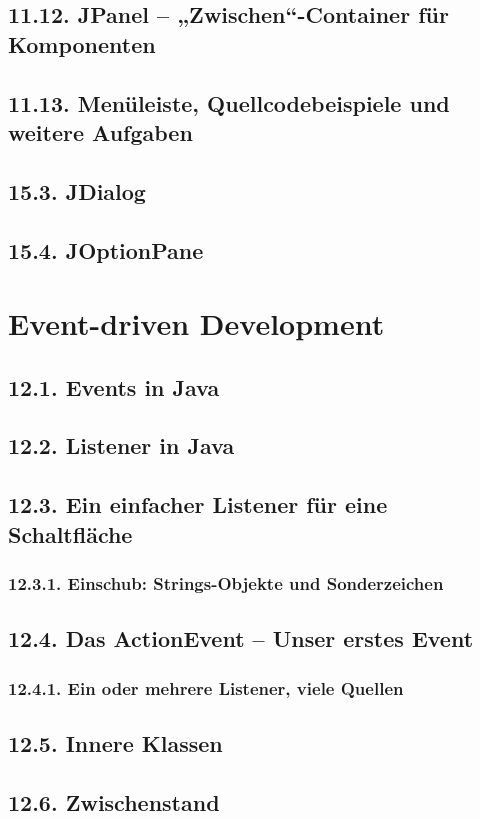 \section{11.12.	JPanel – „Zwischen“-Container für Komponenten}
\section{11.13.	Menüleiste, Quellcodebeispiele und weitere Aufgaben}
\section{15.3.	JDialog}
\section{15.4.	JOptionPane}

\chapter{Event-driven Development}
\section{12.1.	Events in Java}
\section{12.2.	Listener in Java}
\section{12.3.	Ein einfacher Listener für eine Schaltfläche}
\subsection{12.3.1.	Einschub: Strings-Objekte und Sonderzeichen}
\section{12.4.	Das ActionEvent – Unser erstes Event}
\subsection{12.4.1.	Ein oder mehrere Listener, viele Quellen}
\section{12.5.	Innere Klassen}
\section{12.6.	Zwischenstand}
